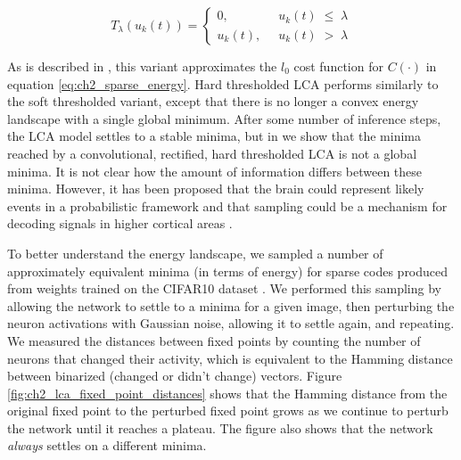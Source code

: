 \begin{equation}\label{eq:ch2_lca_hard_threshold_func}
    T_{\lambda}(u_{k}(t)) = \left\{
    \begin{aligned}
        0,\;\; &u_{k}(t)\; \leq\; \lambda \\
        u_{k}(t),\;\; &u_{k}(t)\; >\; \lambda
    \end{aligned}
    \right.
\end{equation}

As is described in \parencite{rozell2008sparse}, this variant approximates the $l_0$ cost function for $C(\cdot)$ in equation \ref{eq:ch2_sparse_energy}. Hard thresholded LCA performs similarly to the soft thresholded variant, except that there is no longer a convex energy landscape with a single global minimum. After some number of inference steps, the LCA model settles to a stable minima, but in \parencite{shainin2016sampling} we show that the minima reached by a convolutional, rectified, hard thresholded LCA is not a global minima. It is not clear how the amount of information differs between these minima. However, it has been proposed that the brain could represent likely events in a probabilistic framework \parencite{lee2003hierarchical} and that sampling could be a mechanism for decoding signals in higher cortical areas \parencite{hoyer2003interpreting}.

To better understand the energy landscape, we sampled a number of approximately equivalent minima (in terms of energy) for sparse codes produced from weights trained on the CIFAR10 dataset \parencite{krizhevsky2009learning}. We performed this sampling by allowing the network to settle to a minima for a given image, then perturbing the neuron activations with Gaussian noise, allowing it to settle again, and repeating. We measured the distances between fixed points by counting the number of neurons that changed their activity, which is equivalent to the Hamming distance between binarized (changed or didn't change) vectors. Figure \ref{fig:ch2_lca_fixed_point_distances} shows that the Hamming distance from the original fixed point to the perturbed fixed point grows as we continue to perturb the network until it reaches a plateau. The figure also shows that the network \textit{always} settles on a different minima.

